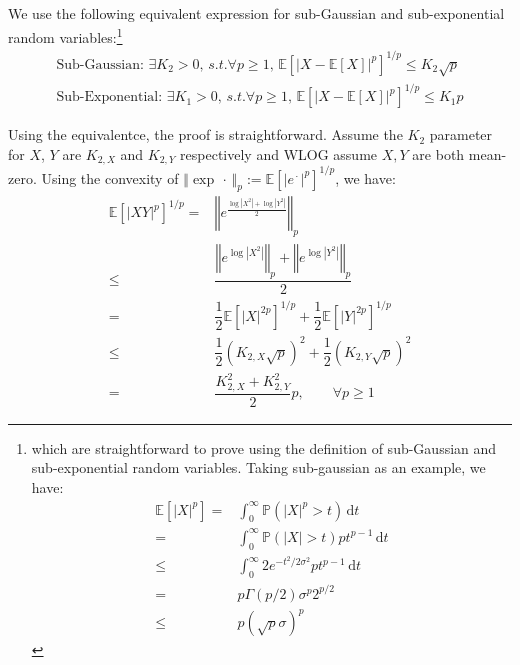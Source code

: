 \documentclass[11pt,a4paper]{ctexart}
\numberwithin{equation}{section}%
\begin{document}
\subsection{}
We use the following equivalent expression for sub-Gaussian and sub-exponential random variables:\footnote{
    which are straightforward to prove using the definition of sub-Gaussian and sub-exponential random variables. Taking sub-gaussian as an example, we have:
    \begin{align*}
        \mathbb{E}\left[ \left\vert X \right\vert ^p \right] =& \int_{0}^\infty \mathbb{P}\left( \left\vert X \right\vert ^p > t \right) \,\mathrm{d}t\\
        =& \int_{0}^\infty \mathbb{P}\left( \left\vert X \right\vert > t \right) pt^{p-1} \,\mathrm{d}t\\
        \leq & \int_{0}^\infty 2e^{-t^2/2\sigma ^2}pt^{p-1} \,\mathrm{d}t\\
        =& p \Gamma (p/2) \sigma ^p 2^{p/2}\\
        \leq & p (\sqrt{p}  \sigma )^p 
    \end{align*}
    
    
}
\begin{align*}
    \text{Sub-Gaussian: }\exists K_2 >0,\, s.t. \forall p\geq 1,\, \mathbb{E}\left[ \left\vert X-\mathbb{E}\left[ X \right]  \right\vert ^p  \right] ^{1/p} \leq K_2\sqrt{p}\\
    \text{Sub-Exponential: }\exists K_1 >0,\, s.t. \forall p\geq 1,\, \mathbb{E}\left[ \left\vert X-\mathbb{E}\left[ X \right]  \right\vert ^p  \right] ^{1/p} \leq K_1p
\end{align*}

Using the equivalentce, the proof is straightforward. Assume the $ K_2 $ parameter for $ X $, $ Y $ are $ K_{2,X} $ and $ K_{2,Y} $ respectively and WLOG assume $ X,Y $ are both mean-zero. Using the convexity of $ \left\Vert \exp \, \cdot \,  \right\Vert _p :=\mathbb{E}\left[ \left\vert e^{\, \cdot \, }  \right\vert ^p  \right] ^{1/p}  $, we have:
\begin{align*}
    \mathbb{E}\left[ \left\vert XY \right\vert^p  \right]^{1/p}= &  \left\Vert   e^{\frac{ \log \left\vert X^2  \right\vert + \log \left\vert Y^2 \right\vert }{ 2 } } \right\Vert _p \\
    \leq & \dfrac{ \left\Vert e^{\log \left\vert X^2  \right\vert } \right\Vert _p + \left\Vert e^{\log \left\vert Y^2  \right\vert } \right\Vert _p }{ 2 }\\
    =& \dfrac{ 1 }{ 2 } \mathbb{E}\left[ \left\vert X \right\vert ^{2p}  \right] ^{1/p} + \dfrac{ 1 }{ 2 } \mathbb{E}\left[ \left\vert Y \right\vert ^{2p}  \right] ^{1/p}\\
    \leq & \dfrac{ 1 }{ 2 }( K_{2,X}\sqrt{p})^2 + \dfrac{ 1 }{ 2 }( K_{2,Y}\sqrt{p})^2\\
    =& \dfrac{ K_{2,X}^2 + K_{2,Y}^2 }{ 2 } p ,\qquad \forall p\geq 1
\end{align*}
\end{document}
